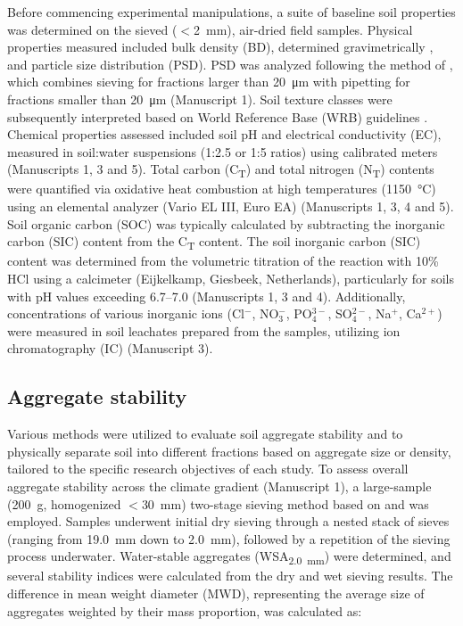 Before commencing experimental manipulations, a suite of baseline soil properties was determined on the sieved ($<$\SI{2}{\milli\metre}), air-dried field samples. Physical properties measured included bulk density (BD), determined gravimetrically \citep{Blake1986}, and particle size distribution (PSD). PSD was analyzed following the method of \citet{Kohn1929}, which combines sieving for fractions larger than \SI{20}{\micro\metre} with pipetting for fractions smaller than \SI{20}{\micro\metre} (Manuscript 1). Soil texture classes were subsequently interpreted based on World Reference Base (WRB) guidelines \citep{Jahn2006}. Chemical properties assessed included soil pH and electrical conductivity (EC), measured in soil:water suspensions (1:2.5 or 1:5 ratios) using calibrated meters (Manuscripts 1, 3 and 5). Total carbon (C\textsubscript{T}) and total nitrogen (N\textsubscript{T}) contents were quantified via oxidative heat combustion at high temperatures (\SI{1150}{\degreeCelsius}) using an elemental analyzer (Vario EL III, Euro EA) (Manuscripts 1, 3, 4 and 5). Soil organic carbon (SOC) was typically calculated by subtracting the inorganic carbon (SIC) content from the C\textsubscript{T} content. The soil inorganic carbon (SIC) content was determined from the volumetric titration of the reaction with 10\% HCl using a calcimeter (Eijkelkamp, Giesbeek, Netherlands), particularly for soils with pH values exceeding 6.7--7.0 (Manuscripts 1, 3 and 4). Additionally, concentrations of various inorganic ions (Cl$^{-}$, NO$_{3}^{-}$, PO$_{4}^{3-}$, SO$_{4}^{2-}$, Na$^{+}$, Ca$^{2+}$) were measured in soil leachates prepared from the samples, utilizing ion chromatography (IC) (Manuscript 3).

\subsection{Aggregate stability}

Various methods were utilized to evaluate soil aggregate stability and to physically separate soil into different fractions based on aggregate size or density, tailored to the specific research objectives of each study. To assess overall aggregate stability across the climate gradient (Manuscript 1), a large-sample (\SI{200}{\gram}, homogenized $<$\SI{30}{\milli\meter}) two-stage sieving method based on \citet{Hartge2009} and \citet{Six2000} was employed. Samples underwent initial dry sieving through a nested stack of sieves (ranging from \SI{19.0}{\milli\meter} down to \SI{2.0}{\milli\meter}), followed by a repetition of the sieving process underwater. Water-stable aggregates (WSA\textsubscript{\SI{2.0}{\milli\meter}}) were determined, and several stability indices were calculated from the dry and wet sieving results. The difference in mean weight diameter (MWD), representing the average size of aggregates weighted by their mass proportion, was calculated as:

